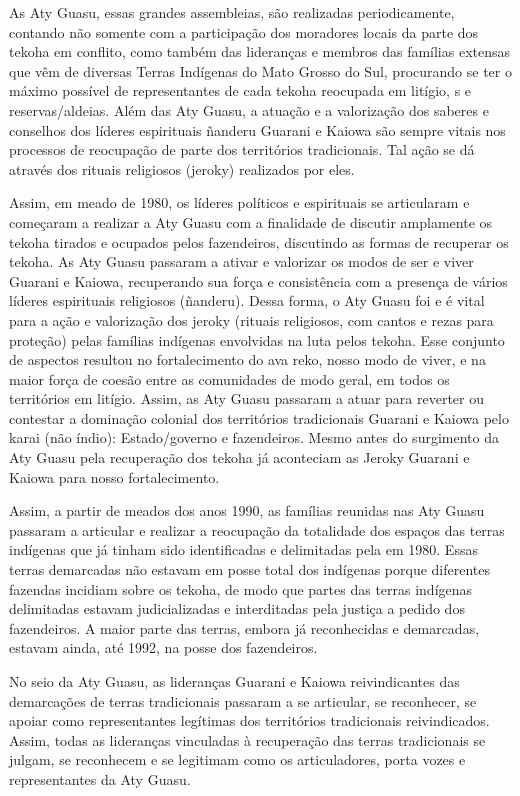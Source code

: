 As Aty Guasu, essas grandes assembleias, são realizadas periodicamente,
contando não somente com a participação dos moradores locais da parte
dos tekoha em conflito, como também das lideranças e membros das
famílias extensas que vêm de diversas Terras Indígenas do Mato Grosso
do Sul, procurando se ter o máximo possível de representantes de cada
tekoha reocupada em litígio,  s e reservas/aldeias. Além das Aty
Guasu, a atuação e a valorização dos saberes e conselhos dos líderes
espirituais ñanderu Guarani e Kaiowa são sempre vitais nos processos de
reocupação de parte dos territórios tradicionais. Tal ação se dá
através dos rituais religiosos (jeroky) realizados por eles.

Assim, em meado de 1980, os líderes políticos e espirituais se
articularam e começaram a realizar a Aty Guasu com a finalidade de
discutir amplamente os tekoha tirados e ocupados pelos fazendeiros,
discutindo as formas de recuperar os tekoha. As Aty Guasu passaram a
ativar e valorizar os modos de ser e viver Guarani e Kaiowa,
recuperando sua força e consistência com a presença de vários líderes
espirituais religiosos (ñanderu). Dessa forma, o Aty Guasu foi e é
vital para a ação e valorização dos jeroky (rituais religiosos, com
cantos e rezas para proteção) pelas famílias indígenas  envolvidas na
luta pelos tekoha. Esse conjunto de aspectos resultou no fortalecimento
do ava reko, nosso modo de viver, e na maior força de coesão entre as
comunidades de modo geral, em todos os territórios em litígio. Assim,
as Aty Guasu passaram a atuar para reverter ou contestar a dominação
colonial dos territórios tradicionais Guarani e Kaiowa pelo karai (não
índio): Estado/governo e fazendeiros. Mesmo antes do surgimento da Aty
Guasu pela recuperação dos tekoha já aconteciam as Jeroky Guarani e
Kaiowa para nosso fortalecimento.

Assim, a partir de meados dos anos 1990, as famílias reunidas nas Aty
Guasu passaram a articular e realizar a reocupação da totalidade dos
espaços das terras indígenas que já tinham sido identificadas e
delimitadas pela  em 1980. Essas terras demarcadas não estavam em
posse total dos indígenas porque diferentes fazendas incidiam sobre os
tekoha, de modo que partes das terras indígenas delimitadas estavam
judicializadas e interditadas pela justiça a pedido dos fazendeiros. A
maior parte das terras, embora já reconhecidas e demarcadas, estavam
ainda, até 1992, na posse dos fazendeiros. 

No seio da Aty Guasu, as lideranças Guarani e Kaiowa reivindicantes das
demarcações de terras tradicionais passaram a se articular, se
reconhecer, se apoiar como representantes legítimas dos territórios
tradicionais reivindicados. Assim, todas as lideranças vinculadas à
recuperação das terras tradicionais se julgam, se reconhecem e se
legitimam como os articuladores, porta vozes e representantes da Aty
Guasu. 

